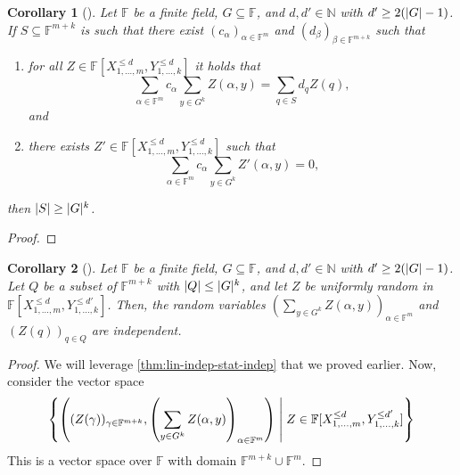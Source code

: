 \documentclass[english]{reedthesis}
\theoremstyle{plain}
\newtheorem{cor}[cor]{Corollary}
\theoremstyle{definition}
\theoremstyle{remark}
\DeclarePairedDelimiter{\abs}{\lvert}{\rvert}
\newcommand{\middlemid}{%
  \ensuremath{\;\middle\vert\;}
}
\begin{document}
\begin{cor}[{\cite[Corollary 12.2]{CFGS22}}]
  Let $\mathbb{F}$ be a finite field, $G \subseteq \mathbb{F}$, and $d, d' \in \mathbb{N}$ with
  $d' \ge 2(\abs{G} - 1)$. If $S \subseteq \mathbb{F}^{m+k}$ is such that there exist
  $(c_{\alpha})_{\alpha \in \mathbb{F}^{m}}$ and $(d_{\beta})_{\beta \in \mathbb{F}^{m+k}}$ such that
  \begin{enumerate}
    \item for all $Z \in \mathbb{F}[X_{1, \ldots, m}^{\le d}, Y_{1, \ldots, k}^{\le d}]$ it
          holds that
          \begin{equation}
            \sum_{\alpha \in \mathbb{F}^{m}}c_{\alpha}\sum_{y \in G^{k}}Z(\alpha, y) = \sum_{q \in S}d_{q}Z(q),
          \end{equation}
          and
    \item there exists $Z' \in \mathbb{F}[X_{1, \ldots, m}^{\le d}, Y_{1, \ldots, k}^{\le d}]$
          such that
          \begin{equation}
            \sum_{\alpha \in \mathbb{F}^{m}}c_{\alpha}\sum_{y \in G^{k}}Z'(\alpha, y) = 0,
          \end{equation}
  \end{enumerate}
  then $\abs{S} \ge \abs{G}^{k}$.
\end{cor}

\begin{proof}
\end{proof}

\begin{cor}[{\cite[Corollary 12.3]{CFGS22}}]
  Let $\mathbb{F}$ be a finite field, $G \subseteq \mathbb{F}$, and $d, d' \in \mathbb{N}$ with
  $d' \ge 2(\abs{G} - 1)$. Let $Q$ be a subset of $\mathbb{F}^{m+k}$ with
  $\abs{Q} \le \abs{G}^{k}$, and let $Z$ be uniformly random in
  $\mathbb{F}[X_{1, \ldots, m}^{\le d}, Y_{1, \ldots, k}^{\le d'}]$. Then, the random
  variables $(\sum_{y \in G^{k}}Z(\alpha, y))_{\alpha \in \mathbb{F}^{m}}$ and $(Z(q))_{q \in Q}$
  are independent.
\end{cor}

\begin{proof}
  We will leverage \cref{thm:lin-indep-stat-indep} that we proved earlier. Now,
  consider the vector space
  \begin{equation} %
    \mleft\{
      \mleft(
        (Z(\gamma))_{\gamma \in \mathbb{F}^{m+k}}, \mleft(\sum_{y \in G^{k}}Z(\alpha, y)\mright)_{\alpha \in \mathbb{F}^{m}}
      \mright)
      \middlemid
      Z \in \mathbb{F}[X_{1, \ldots, m}^{\le d}, Y_{1, \ldots, k}^{\le d'}]
    \mright\}
  \end{equation}
  This is a vector space over $\mathbb{F}$ with domain
  $\mathbb{F}^{m+k} \cup \mathbb{F}^{m}$. %
\end{proof}
\end{document}
